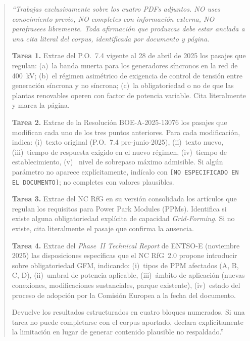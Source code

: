 \begin{quote}
    \itshape\small
    ``Trabajas exclusivamente sobre los cuatro PDFs adjuntos. NO uses
    conocimiento previo, NO completes con información externa, NO
    parafrasees libremente. Toda afirmación que produzcas debe estar
    anclada a una cita literal del corpus, identificada por documento y
    página.

    \medskip
    \textbf{Tarea 1.} Extrae del P.O.~7.4 vigente al 28 de abril de
    2025 los pasajes que regulan: (a)~la banda muerta para los
    generadores síncronos en la red de 400~kV; (b)~el régimen
    asimétrico de exigencia de control de tensión entre generación
    síncrona y no síncrona; (c)~la obligatoriedad o no de que las
    plantas renovables operen con factor de potencia variable. Cita
    literalmente y marca la página.

    \medskip
    \textbf{Tarea 2.} Extrae de la Resolución BOE-A-2025-13076 los
    pasajes que modifican cada uno de los tres puntos anteriores. Para
    cada modificación, indica: (i)~texto original (P.O.~7.4
    pre-junio-2025), (ii)~texto nuevo, (iii)~tiempo de respuesta
    exigido en el nuevo régimen, (iv)~tiempo de establecimiento, (v)~
    nivel de sobrepaso máximo admisible. Si algún parámetro no aparece
    explícitamente, indícalo con \texttt{[NO ESPECIFICADO EN EL
    DOCUMENTO]}; no completes con valores plausibles.

    \medskip
    \textbf{Tarea 3.} Extrae del NC RfG en su versión consolidada los
    artículos que regulan los requisitos para Power Park Modules
    (PPMs). Identifica si existe alguna obligatoriedad explícita de
    capacidad \textit{Grid-Forming}. Si no existe, cita literalmente el
    pasaje que confirma la ausencia.

    \medskip
    \textbf{Tarea 4.} Extrae del \textit{Phase~II Technical Report} de
    ENTSO-E (noviembre 2025) las disposiciones específicas que el NC
    RfG~2.0 propone introducir sobre obligatoriedad GFM, indicando:
    (i)~tipos de PPM afectados (A, B, C, D), (ii)~umbral de potencia
    aplicable, (iii)~ámbito de aplicación (nuevas conexiones,
    modificaciones sustanciales, parque existente), (iv)~estado del
    proceso de adopción por la Comisión Europea a la fecha del
    documento.

    \medskip
    Devuelve los resultados estructurados en cuatro bloques numerados.
    Si una tarea no puede completarse con el corpus aportado, declara
    explícitamente la limitación en lugar de generar contenido
    plausible no respaldado.''
\end{quote}

